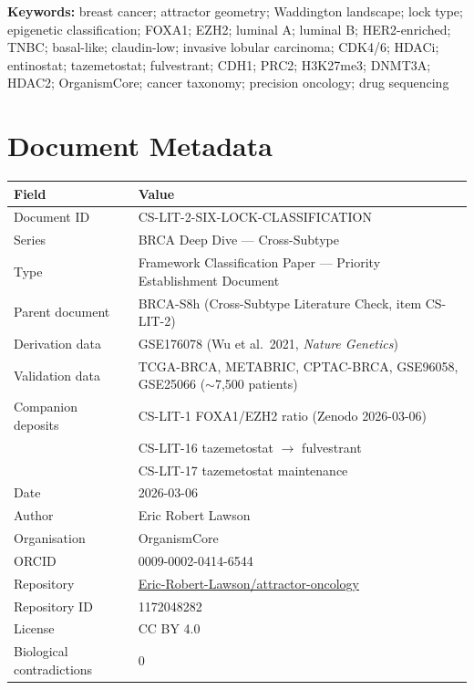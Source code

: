 \documentclass[12pt, a4paper]{article}
\begin{document}
\vspace{0.5em}
\noindent\textbf{Keywords:}
breast cancer; attractor geometry; Waddington landscape;
lock type; epigenetic classification; FOXA1; EZH2;
luminal A; luminal B; HER2-enriched; TNBC; basal-like;
claudin-low; invasive lobular carcinoma; CDK4/6;
HDACi; entinostat; tazemetostat; fulvestrant; CDH1;
PRC2; H3K27me3; DNMT3A; HDAC2; OrganismCore;
cancer taxonomy; precision oncology; drug sequencing

\newpage
\tableofcontents
\newpage

\section{Document Metadata}

\begin{center}
\begin{tabular}{ll}
\toprule
\textbf{Field} & \textbf{Value} \\
\midrule
Document ID     & CS-LIT-2-SIX-LOCK-CLASSIFICATION \\
Series          & BRCA Deep Dive --- Cross-Subtype \\
Type            & Framework Classification Paper ---
                  Priority Establishment Document \\
Parent document & BRCA-S8h (Cross-Subtype Literature
                  Check, item CS-LIT-2) \\
Derivation data & GSE176078 (Wu et al.\ 2021,
                  \textit{Nature Genetics}) \\
Validation data & TCGA-BRCA, METABRIC, CPTAC-BRCA,
                  GSE96058, GSE25066 ($\sim$7,500 patients) \\
Companion deposits
& CS-LIT-1 FOXA1/EZH2 ratio (Zenodo 2026-03-06)\\
& CS-LIT-16 tazemetostat $\rightarrow$ fulvestrant\\
& CS-LIT-17 tazemetostat maintenance \\
Date            & 2026-03-06 \\
Author          & Eric Robert Lawson \\
Organisation    & OrganismCore \\
ORCID           & 0009-0002-0414-6544 \\
Repository      &
  \href{https://github.com/Eric-Robert-Lawson/attractor-oncology}
       {Eric-Robert-Lawson/attractor-oncology} \\
Repository ID   & 1172048282 \\
License         & CC BY 4.0 \\
Biological contradictions & 0 \\
\bottomrule
\end{tabular}
\end{center}
\end{document}
